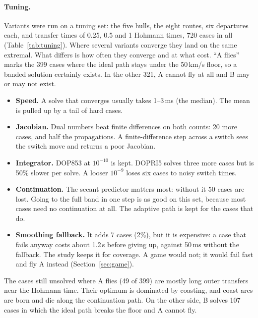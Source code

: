 \documentclass[10pt,a4paper]{article}
\begin{document}
\paragraph{Tuning.} Variants were run on a tuning set: the five hulls, the eight routes, six departures each, and
transfer times of 0.25, 0.5 and 1 Hohmann times, 720 cases in all (Table~\ref{tab:tuning}). Where several variants converge they land on the same extremal. What differs is how often they converge and at
what cost. ``A flies'' marks the 399 cases where the ideal path stays under the 50\,km/s floor, so a banded
solution certainly exists. In the other 321, A cannot fly at all and B may or may not exist.
\begin{itemize}
\item \textbf{Speed.} A solve that converges usually takes 1--3\,ms (the median). The mean is pulled up by a tail
  of hard cases.
\item \textbf{Jacobian.} Dual numbers beat finite differences on both counts: 20 more cases, and half the
  propagations. A finite-difference step across a switch sees the switch move and returns a poor Jacobian.
\item \textbf{Integrator.} DOP853 at $10^{-10}$ is kept. DOPRI5 solves three more cases but is 50\% slower per
  solve. A looser $10^{-9}$ loses six cases to noisy switch times.
\item \textbf{Continuation.} The secant predictor matters most: without it 50 cases are lost. Going to the full
  band in one step is as good on this set, because most cases need no continuation at all. The adaptive path is
  kept for the cases that do.
\item \textbf{Smoothing fallback.} It adds 7 cases (2\%), but it is expensive: a case that fails anyway costs about
  1.2\,s before giving up, against 50\,ms without the fallback. The study keeps it for coverage. A game would not;
  it would fail fast and fly A instead (Section~\ref{sec:game}).
\end{itemize}
The cases still unsolved where A flies (49 of 399) are mostly long outer transfers near the Hohmann time. Their
optimum is dominated by coasting, and coast arcs are born and die along the continuation path. On the other side,
B solves 107 cases in which the ideal path breaks the floor and A cannot fly.

\begin{table}[h]\centering\small
\caption{Solver variants on the tuning set (cases where the ideal problem solves). One process per variant, eight
in parallel, so absolute times are indicative; Table~\ref{tab:timing} has the one-thread timings.}
\label{tab:tuning}
\tabtuning
\end{table}
\end{document}
